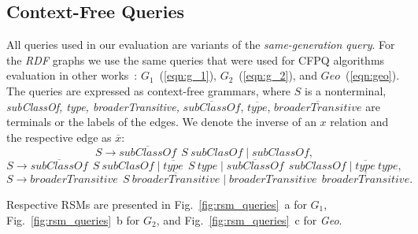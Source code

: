 \documentclass[
11pt,%
tightenlines,%
twoside,%
onecolumn,%
nobibnotes,%
nofootinbib,%
superscriptaddress,%
noshowpacs,%
longbibliography,%
centertags]%
{revtex4-2}
\begin{document}
\subsection{Context-Free Queries}

All queries used in our evaluation are variants of the \textit{same-generation query}. For the \textit{RDF} graphs we use the same queries that were used for CFPQ algorithms evaluation in other works~\cite{Azimov:2018:CPQ:3210259.3210264,Kuijpers:2019:ESC:3335783.3335791}: $G_1$~(\ref{eqn:g_1}), $G_2$~(\ref{eqn:g_2}), and $Geo$~(\ref{eqn:geo}). The queries are expressed as context-free grammars, where $S$ is a nonterminal, \textit{subClassOf, type, broaderTransitive, }$ \overline{\textit{subClassOf}}$, $\overline{\textit{type}}$, $\overline{\textit{broaderTransitive}}$ are terminals or the labels of the edges. We denote the inverse of an $x$ relation and the respective edge as $\overline{x}$:
\begin{equation}
\label{eqn:g_2}
S \to \overline{\textit{subClassOf}} \ \ S \ \textit{subClasOf} \mid \textit{subClassOf},
\end{equation}
\begin{equation}
\label{eqn:g_1}
S \to  \overline{\textit{subClassOf}} \ \ S \ \textit{subClasOf} \mid \overline{\textit{type}} \ \ S \ \textit{type} \mid \overline{\textit{subClassOf}} \ \ \textit{subClassOf} \mid \overline{\textit{type}} \ \textit{type},
\end{equation}
\begin{equation}
\label{eqn:geo}
S \to  \textit{broaderTransitive} \ \  S \ \overline{\textit{broaderTransitive}} 
       \mid \textit{broaderTransitive} \ \  \overline{\textit{broaderTransitive}}.
\end{equation}

Respective RSMs are presented in Fig.~\ref{fig:rsm_queries}~a for $G_1$, Fig.~\ref{fig:rsm_queries}~b for $G_2$, and Fig.~\ref{fig:rsm_queries}~c for \textit{Geo}.





\end{document}

